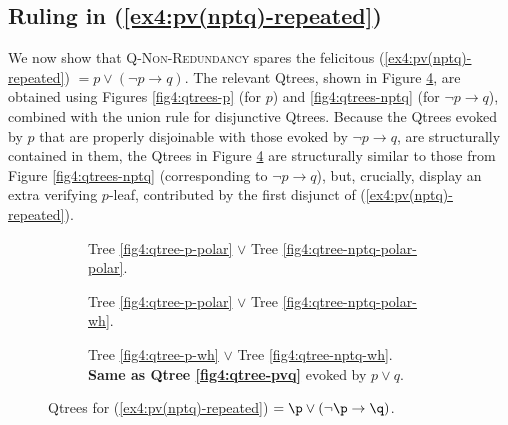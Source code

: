\subsection{Ruling in (\ref{ex4:pv(nptq)-repeated})}\label{sec:rule-in}
We now show that \textsc{Q-Non-Redundancy} spares the felicitous (\ref{ex4:pv(nptq)-repeated}) $= p \vee (\neg p \rightarrow q)$. The relevant Qtrees, shown in Figure \ref{fig4:qtrees-pv(nptq)}, are obtained using Figures \ref{fig4:qtrees-p} (for $p$) and \ref{fig4:qtrees-nptq} (for $\neg p \rightarrow q$), combined with the union rule for disjunctive Qtrees. Because the Qtrees evoked by $p$ that are properly disjoinable with those evoked by $\neg p \rightarrow q$, are structurally contained in them, the Qtrees in Figure \ref{fig4:qtrees-pv(nptq)} are structurally similar to those from Figure \ref{fig4:qtrees-nptq} (corresponding to $\neg p \rightarrow q$), but, crucially, display an extra verifying $p$-leaf, contributed by the first disjunct of (\ref{ex4:pv(nptq)-repeated}). 

\begin{figure}[H]\setlength{\fboxsep}{2pt}
	\centering
	\begin{subfigure}[b]{.3\linewidth}
		\centering
		\caption[]{Tree \ref{fig4:qtree-p-polar} $\vee$ Tree \ref{fig4:qtree-nptq-polar-polar}.}\label{fig4:qtree-pv(nptq)-polar-polar}
	\end{subfigure}\hfill
	\begin{subfigure}[b]{.3\linewidth}
		\centering
		\scalebox{1}{
			\begin{forest}
				[CS [{\fbox{$\p$}}][{$\neg \p$} [\fbox{$\q$}][$\r$][...]]]
			\end{forest}
		}
		\caption[]{Tree \ref{fig4:qtree-p-polar} $\vee$ Tree \ref{fig4:qtree-nptq-polar-wh}.}\label{fig4:qtree-pv(nptq)-polar-wh}
	\end{subfigure}\hfill
	\begin{subfigure}[b]{.35\linewidth}
		\centering
		\scalebox{1}{
			\begin{forest}
				[CS [{\fbox{$\p$}}][\fbox{$\q$}][{$\r$}][...]]
			\end{forest}
		}
		\caption[]{Tree \ref{fig4:qtree-p-wh} $\vee$ Tree \ref{fig4:qtree-nptq-wh}.\\ \textbf{Same as Qtree \ref{fig4:qtree-pvq}} evoked by $p \vee q$.}\label{fig4:qtree-pv(nptq)-wh}
	\end{subfigure}
	\caption[]{Qtrees for (\ref{ex4:pv(nptq)-repeated}) $= \p \vee (\neg \p \rightarrow \q)$.}\label{fig4:qtrees-pv(nptq)}
\end{figure}

